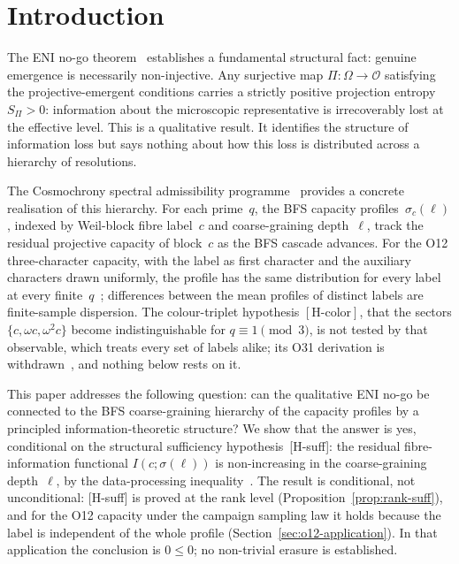 \documentclass[11pt,a4paper]{article}
\theoremstyle{plain}
\theoremstyle{definition}
\theoremstyle{remark}
\newcommand{\Omegaspace}{\Omega}
\newcommand{\Obs}{\mathcal{O}}
\begin{document}
  \newpage

  \section{Introduction}
    \label{sec:intro}

    The ENI no-go theorem~\cite{Beau2026l} establishes a fundamental structural fact:
    genuine emergence is necessarily non-injective.
    Any surjective map $\Pi : \Omegaspace \to \Obs$ satisfying the projective-emergent
    conditions carries a strictly positive projection entropy~$S_\Pi > 0$:
    information about the microscopic representative is irrecoverably lost at the effective level.
    This is a qualitative result.
    It identifies the structure of information loss but says nothing about how this loss
    is distributed across a hierarchy of resolutions.

    The Cosmochrony spectral admissibility programme~\cite{Beau2026a1note} provides a concrete
    realisation of this hierarchy.
    For each prime~$q$, the BFS capacity profiles~$\sigma_c(\ell)$, indexed by
    Weil-block fibre label~$c$ and coarse-graining depth~$\ell$,
    track the residual projective capacity of block~$c$ as the BFS cascade advances.
    For the O12 three-character capacity, with the label as first character and the
    auxiliary characters drawn uniformly, the profile has the same distribution for every
    label at every finite~$q$~\cite{Beau2026a36}; differences between the mean profiles of
    distinct labels are finite-sample dispersion.
    The colour-triplet hypothesis $[\mathrm{H\text{-}color}]$, that the sectors
    $\{c, \omega c, \omega^2 c\}$ become indistinguishable for $q \equiv 1 \pmod{3}$,
    is not tested by that observable, which treats every set of labels alike; its O31
    derivation is withdrawn~\cite{Beau2026a35}, and nothing below rests on it.

    This paper addresses the following question:
    can the qualitative ENI no-go be connected to the BFS coarse-graining hierarchy of the
    capacity profiles by a principled information-theoretic structure?
    We show that the answer is yes, conditional on the structural sufficiency
    hypothesis~\textup{[H-suff]}:
    the residual fibre-information functional $I(c;\sigma(\ell))$
    is non-increasing in the coarse-graining depth~$\ell$,
    by the data-processing inequality~\cite{CoverThomas2006}.
    The result is conditional, not unconditional:
    \textup{[H-suff]} is proved at the rank level (Proposition~\ref{prop:rank-suff}),
    and for the O12 capacity under the campaign sampling law it holds because the label is
    independent of the whole profile (Section~\ref{sec:o12-application}).
    In that application the conclusion is $0 \leq 0$; no non-trivial erasure is established.
\end{document}
